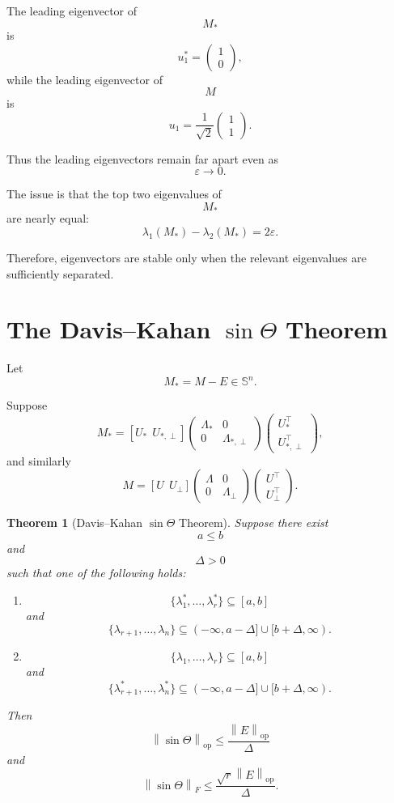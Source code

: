 \documentclass[12pt,oneside]{book}
\numberwithin{equation}{section}
\theoremstyle{definition}
\theoremstyle{plain}
\newtheorem{theorem}{Theorem}[section]
\theoremstyle{remark}
\newcommand{\norm}[1]{\left\lVert #1 \right\rVert}
\begin{document}
The leading eigenvector of
\[
M_*
\]
is
\[
u_1^*=
\begin{pmatrix}
1\\
0
\end{pmatrix},
\]
while the leading eigenvector of
\[
M
\]
is
\[
u_1
=
\frac{1}{\sqrt{2}}
\begin{pmatrix}
1\\
1
\end{pmatrix}.
\]

Thus the leading eigenvectors remain far apart even as
\[
\varepsilon\to0.
\]

The issue is that the top two eigenvalues of
\[
M_*
\]
are nearly equal:
\[
\lambda_1(M_*)-\lambda_2(M_*)
=
2\varepsilon.
\]

Therefore, eigenvectors are stable only when the relevant eigenvalues are sufficiently separated.

\section{The Davis--Kahan $\sin\Theta$ Theorem}

Let
\[
M_*=M-E\in\mathbb{S}^n.
\]

Suppose
\[
M_*
=
[U_*\ \ U_{*,\perp}]
\begin{pmatrix}
\Lambda_* & 0\\
0 & \Lambda_{*,\perp}
\end{pmatrix}
\begin{pmatrix}
U_*^\top\\
U_{*,\perp}^\top
\end{pmatrix},
\]
and similarly
\[
M
=
[U\ \ U_\perp]
\begin{pmatrix}
\Lambda & 0\\
0 & \Lambda_\perp
\end{pmatrix}
\begin{pmatrix}
U^\top\\
U_\perp^\top
\end{pmatrix}.
\]

\begin{theorem}[Davis--Kahan $\sin\Theta$ Theorem]
Suppose there exist
\[
a\leq b
\]
and
\[
\Delta>0
\]
such that one of the following holds:

\begin{enumerate}
\item
\[
\{\lambda_1^*,\dots,\lambda_r^*\}
\subseteq
[a,b]
\]
and
\[
\{\lambda_{r+1},\dots,\lambda_n\}
\subseteq
(-\infty,a-\Delta]
\cup
[b+\Delta,\infty).
\]

\item
\[
\{\lambda_1,\dots,\lambda_r\}
\subseteq
[a,b]
\]
and
\[
\{\lambda_{r+1}^*,\dots,\lambda_n^*\}
\subseteq
(-\infty,a-\Delta]
\cup
[b+\Delta,\infty).
\]
\end{enumerate}

Then
\[
\norm{\sin\Theta}_{\mathrm{op}}
\leq
\frac{\norm{E}_{\mathrm{op}}}{\Delta}
\]
and
\[
\norm{\sin\Theta}_F
\leq
\frac{\sqrt{r}\norm{E}_{\mathrm{op}}}{\Delta}.
\]
\end{theorem}
\end{document}
